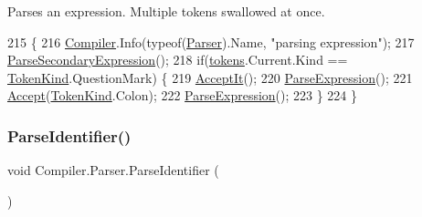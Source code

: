 Parses an expression. Multiple tokens swallowed at once. 
\begin{DoxyCode}
215                                                      \{
216                         \mbox{\hyperlink{namespace_compiler}{Compiler}}.Info(typeof(\mbox{\hyperlink{class_compiler_1_1_parser_a450e11452db3f91ff866fc1e36ebc79d}{Parser}}).Name, \textcolor{stringliteral}{"parsing expression"});
217                         \mbox{\hyperlink{class_compiler_1_1_parser_a2c35615302bb055e4e720b94e5020a59}{ParseSecondaryExpression}}();
218                         \textcolor{keywordflow}{if}(\mbox{\hyperlink{class_compiler_1_1_parser_a4db075175c853a197c7b8db7d787a0a5}{tokens}}.Current.Kind == \mbox{\hyperlink{namespace_compiler_a57929962f25004759596fc3f13cf563c}{TokenKind}}.QuestionMark) \{
219                             \mbox{\hyperlink{class_compiler_1_1_parser_ae19e507e1e2460cbad35b03d24402b4f}{AcceptIt}}();
220                             \mbox{\hyperlink{class_compiler_1_1_parser_a8c6c2073d17ac572fb9117892cbf5aa1}{ParseExpression}}();
221                             \mbox{\hyperlink{class_compiler_1_1_parser_aaedaac51ec193dd68541fd9d39fddde8}{Accept}}(\mbox{\hyperlink{namespace_compiler_a57929962f25004759596fc3f13cf563c}{TokenKind}}.Colon);
222                             \mbox{\hyperlink{class_compiler_1_1_parser_a8c6c2073d17ac572fb9117892cbf5aa1}{ParseExpression}}();
223                         \}
224                     \}
\end{DoxyCode}
\mbox{\label{class_compiler_1_1_parser_af099ac84308e83bf30b3dfd6dc51bd32}} 
\subsubsection{\texorpdfstring{Parse\+Identifier()}{ParseIdentifier()}}
{\footnotesize\ttfamily void Compiler.\+Parser.\+Parse\+Identifier (\begin{DoxyParamCaption}{ }\end{DoxyParamCaption})\hspace{0.3cm}{\ttfamily [protected]}}

